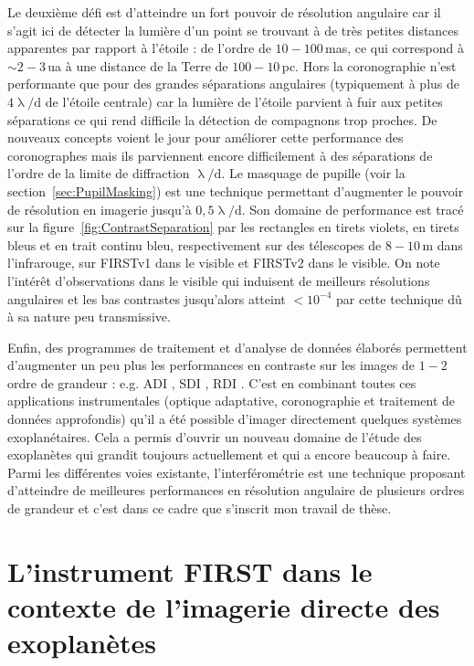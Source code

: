 Le deuxième défi est d'atteindre un fort pouvoir de résolution angulaire car il s'agit ici de détecter la lumière d'un point se trouvant à de très petites distances apparentes par rapport à l'étoile : de l'ordre de $10 - 100 \,$mas, ce qui correspond à $\sim 2-3 \,$ua à une distance de la Terre de $100 - 10 \,$pc. Hors la coronographie n'est performante que pour des grandes séparations angulaires (typiquement à plus de $4 \uplambda / \text{d}$ de l'étoile centrale) car la lumière de l'étoile parvient à fuir aux petites séparations ce qui rend difficile la détection de compagnons trop proches. De nouveaux concepts voient le jour pour améliorer cette performance des coronographes \citep{mawet2012} mais ils parviennent encore difficilement à des séparations de l'ordre de la limite de diffraction $\uplambda / \text{d}$. Le masquage de pupille (voir la section~\ref{sec:PupilMasking}) est une technique permettant d'augmenter le pouvoir de résolution en imagerie jusqu'à $0,5 \uplambda / \text{d}$. Son domaine de performance est tracé sur la figure~\ref{fig:ContrastSeparation} par les rectangles en tirets violets, en tirets bleus et en trait continu bleu, respectivement sur des télescopes de $8 - 10 \,$m dans l'infrarouge, sur \ac{FIRSTv1} dans le visible et \ac{FIRSTv2} dans le visible. On note l'intérêt d'observations dans le visible qui induisent de meilleurs résolutions angulaires et les bas contrastes jusqu'alors atteint $< 10^{-4}$ par cette technique dû à sa nature peu transmissive.

Enfin, des programmes de traitement et d'analyse de données élaborés permettent d'augmenter un peu plus les performances en contraste sur les images de $1 - 2$ ordre de grandeur : e.g. \ac{ADI} \citep{marois2006}, \ac{SDI} \citep{marois2000}, \ac{RDI} \citep{lafreniere2009}. C'est en combinant toutes ces applications instrumentales (optique adaptative, coronographie et traitement de données approfondis) qu'il a été possible d'imager directement quelques systèmes exoplanétaires. Cela a permis d'ouvrir un nouveau domaine de l'étude des exoplanètes qui grandit toujours actuellement et qui a encore beaucoup à faire. Parmi les différentes voies existante, l'interférométrie est une technique proposant d'atteindre de meilleures performances en résolution angulaire de plusieurs ordres de grandeur et c'est dans ce cadre que s'inscrit mon travail de thèse.


\section{L'instrument FIRST dans le contexte de l'imagerie directe des exoplanètes}

